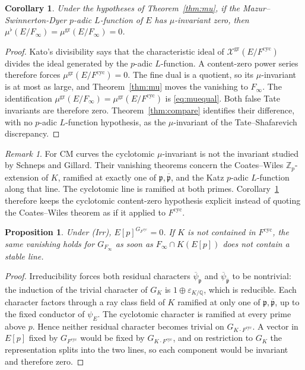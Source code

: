\documentclass[11pt]{article}
\newtheorem{proposition}[theorem]{Proposition}
\newtheorem{corollary}[theorem]{Corollary}
\theoremstyle{definition}
\theoremstyle{remark}
\newtheorem{remark}[theorem]{Remark}
\newcommand{\Z}{\mathbb{Z}}
\newcommand{\Q}{\mathbb{Q}}
\newcommand{\cyc}{\mathrm{cyc}}
\newcommand{\gr}{\mathrm{gr}}
\newcommand{\flatp}{\flat}
\newcommand{\pp}{\mathfrak{p}}
\newcommand{\ppb}{\overline{\mathfrak{p}}}
\newcommand{\cX}{\mathcal{X}}
\begin{document}
\begin{corollary}
\label{cor:transfer}
Under the hypotheses of Theorem~\ref{thm:mu}, if the Mazur--Swinnerton-Dyer \(p\)-adic \(L\)-function of \(E\) has \(\mu\)-invariant zero, then \(\mu^{\flatp}(E/F_\infty)=\mu^{\gr}(E/F_\infty)=0\).
\end{corollary}

\begin{proof}
Kato's divisibility says that the characteristic ideal of \(\cX^{\gr}(E/F^{\cyc})\) divides the ideal generated by the \(p\)-adic \(L\)-function. A content-zero power series therefore forces \(\mu^{\gr}(E/F^{\cyc})=0\). The fine dual is a quotient, so its \(\mu\)-invariant is at most as large, and Theorem~\ref{thm:mu} moves the vanishing to \(F_\infty\). The identification \(\mu^{\gr}(E/F_\infty)=\mu^{\gr}(E/F^{\cyc})\) is \eqref{eq:muequal}. Both false Tate invariants are therefore zero. Theorem~\ref{thm:compare} identifies their difference, with no \(p\)-adic \(L\)-function hypothesis, as the \(\mu\)-invariant of the Tate--Shafarevich discrepancy.
\end{proof}

\begin{remark}
For CM curves the cyclotomic \(\mu\)-invariant is not the invariant studied by Schneps and Gillard. Their vanishing theorems concern the Coates--Wiles \(\Z_p\)-extension of \(K\), ramified at exactly one of \(\pp,\ppb\), and the Katz \(p\)-adic \(L\)-function along that line. The cyclotomic line is ramified at both primes. Corollary~\ref{cor:transfer} therefore keeps the cyclotomic content-zero hypothesis explicit instead of quoting the Coates--Wiles theorem as if it applied to \(F^{\cyc}\).
\end{remark}

\begin{proposition}
\label{prop:irrinv}
Under \textup{(Irr)}, \(E[p]^{G_{F^{\cyc}}}=0\). If \(K\) is not contained in \(F^{\cyc}\), the same vanishing holds for \(G_{F_\infty}\) as soon as \(F_\infty\cap K(E[p])\) does not contain a stable line.
\end{proposition}

\begin{proof}
Irreducibility forces both residual characters \(\overline{\psi}_{\pp}\) and \(\overline{\psi}_{\ppb}\) to be nontrivial: the induction of the trivial character of \(G_K\) is \(1\oplus\varepsilon_{K/\Q}\), which is reducible. Each character factors through a ray class field of \(K\) ramified at only one of \(\pp,\ppb\), up to the fixed conductor of \(\psi_E\). The cyclotomic character is ramified at every prime above \(p\). Hence neither residual character becomes trivial on \(G_{K\cdot F^{\cyc}}\). A vector in \(E[p]\) fixed by \(G_{F^{\cyc}}\) would be fixed by \(G_{K\cdot F^{\cyc}}\), and on restriction to \(G_K\) the representation splits into the two lines, so each component would be invariant and therefore zero.
\end{proof}
\end{document}
